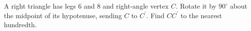 A right triangle has legs $6$ and $8$ and right-angle vertex $C$. Rotate it by $90^\circ$ about the midpoint of its hypotenuse, sending $C$ to $C^{\prime}$. Find $CC^{\prime}$ to the nearest hundredth.
